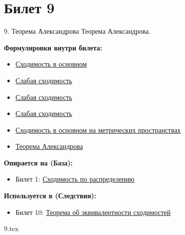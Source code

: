 \documentclass[a4paper, 12pt]{article}
\newcommand{\ticketsection}[1]{\vspace{0.5em}\noindent\textbf{\textcolor{ticketdark}{\sffamily #1}}\par}
\begin{document}
\section{Билет 9}
\begin{ticketskeleton}{9. Теорема Александрова}
     Теорема Александрова.

    \ticketsection{Формулировки внутри билета:}
    \begin{itemize}
        \item \hyperref[def:conv_main]{ Сходимость в основном}
        \item \hyperref[def:conv_weak]{ Слабая сходимость}
        \item \hyperref[def:borel_algebra]{ Слабая сходимость}
        \item \hyperref[prop:prop_sep_borel]{ Слабая сходимость}
        \item \hyperref[def:conv_main_metric]{ Сходимость в основном на метрических пространствах}
        \item \hyperref[thm:alexandrov]{ Теорема Александрова}
    \end{itemize}

    \ticketsection{Опирается на (База):}
    \begin{itemize}
        \item Билет 1: \hyperref[def:conv_dist]{Сходимость по распределению}
    \end{itemize}

    \ticketsection{Используется в (Следствия):}
    \begin{itemize}
        \item Билет 10: \hyperref[thm:equiv_conv]{Теорема об эквивалентности сходимостей}
    \end{itemize}
\end{ticketskeleton}
{9.tex}
\end{document}
